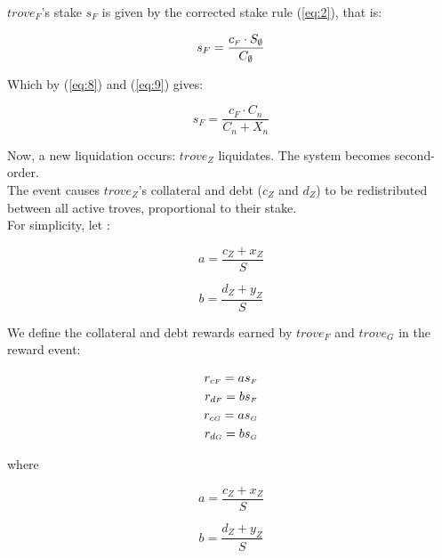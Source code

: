\documentclass[reqno]{article}
\begin{document}
\bigskip
$trove_F$’s stake $s_F$ is given by the corrected stake rule (\ref{eq:2}), that is:

\begin{equation} 
    s_F=\frac{c_\mathsmaller{F} \cdot S_\emptyset}{C_\emptyset}
\end{equation}

\bigskip
Which by (\ref{eq:8}) and (\ref{eq:9}) gives:

\begin{equation} \label{eq:17}
    s_F=\frac{c_F \cdot C_n}{C_n+X_n}
\end{equation}

\bigskip
Now, a new liquidation occurs: $trove_Z$ liquidates. The system becomes second-order.\\

The event causes $trove_Z$’s collateral and debt ($c_Z$ and $d_Z$) to be redistributed between all active troves, proportional to their stake.\\

For simplicity, let :

\begin{equation} 
    a=\frac{c_Z+x_Z}{S}
\end{equation}

\begin{equation} 
    b=\frac{d_Z+y_Z}{S}
\end{equation}

\bigskip
We define the collateral and debt rewards earned by $trove_F$ and $trove_G$ in the reward event:

\begin{equation} \label{eq:20}
    \begin{split}
        r_{c\mathsmaller{F}}=as_\mathsmaller{F}\\
        r_{d\mathsmaller{F}}=bs_\mathsmaller{F}\\
        r_{c\mathsmaller{G}}=as_\mathsmaller{G}\\
        r_{d\mathsmaller{G}}=bs_\mathsmaller{G}
    \end{split}
\end{equation}

\bigskip
where

\begin{equation} 
    a=\frac{c_Z+x_Z}{S}
\end{equation}

\begin{equation} 
    b=\frac{d_Z+y_Z}{S}
\end{equation}
\end{document}
